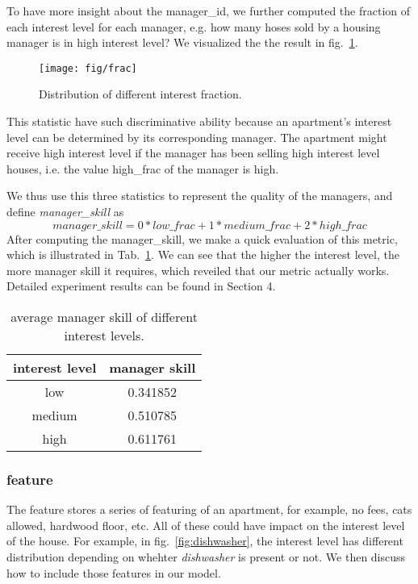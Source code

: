 \documentclass{article} %
\begin{document}
To have more insight about the manager\_id, we further computed the fraction of each interest level for each manager, e.g. how many hoses sold by a housing manager is in high interest level? We visualized the the result in fig.~\ref{fig:frac}.

\begin{figure}[H]
	\centering
	\texttt{[image: fig/frac]}
	\caption{Distribution of different interest fraction.}
	\label{fig:frac}
\end{figure}

This statistic have such discriminative ability because an apartment's interest level can be determined by its corresponding manager. The apartment might receive high interest level if the manager has been selling high interest level houses, i.e. the  value high\_frac of the manager is high.

We thus use this three statistics to represent the quality of the managers, and define \textit{manager\_skill} as
$$ manager\_skill = 0 * low\_frac + 1 * medium\_frac + 2 * high\_frac $$
After computing the manager\_skill, we make a quick evaluation of this metric, which is illustrated in Tab.~\ref{tab:skill}. We can see that the higher the interest level, the more manager skill it requires, which reveiled that our metric actually works. Detailed experiment results can be found in Section 4.
\begin{table}[H]
	\centering
	\begin{tabular}{cc}
		interest level	&	manager skill \\ \hline \hline
		low				&	0.341852		\\ 
		medium			&	0.510785		\\
		high			&	0.611761		\\
	\end{tabular}
	\caption{average manager skill of different interest levels.}
	\label{tab:skill}
\end{table}
\subsubsection{feature}
The feature stores a series of featuring of an apartment, for example, no fees, cats allowed, hardwood floor, etc. All of these could have impact on the interest level of the house. For example, in fig.~\ref{fig:dishwasher}, the interest level has different distribution depending on whehter \textit{dishwasher} is present or not. We then discuss how to include those features in our model.
\end{document}
